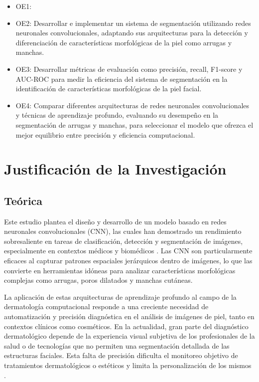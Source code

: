 \newcommand{\Objtwo}{
Desarrollar e implementar un sistema de segmentación utilizando redes neuronales convolucionales, adaptando sus arquitecturas para la detección y diferenciación de características morfológicas de la piel como arrugas y manchas.
}

\newcommand{\Objthree}{
Desarrollar métricas de evaluación como precisión, recall, F1-score y AUC-ROC para medir la eficiencia del sistema de segmentación en la identificación de características morfológicas de la piel facial.
}

\newcommand{\Objfour}{
Comparar diferentes arquitecturas de redes neuronales convolucionales y técnicas de aprendizaje profundo, evaluando su desempeño en la segmentación de arrugas y manchas, para seleccionar el modelo que ofrezca el mejor equilibrio entre precisión y eficiencia computacional.
}

\begin{itemize}
	\item OE1: {\Objone}
	\item OE2: {\Objtwo}
	\item OE3: {\Objthree}
	\item OE4: {\Objfour}
\end{itemize}


\section{Justificación de la Investigación}

\subsection{Teórica}

Este estudio plantea el diseño y desarrollo de un modelo basado en redes neuronales convolucionales (CNN), las cuales han demostrado un rendimiento sobresaliente en tareas de clasificación, detección y segmentación de imágenes, especialmente en contextos médicos y biomédicos \parencite{esteva2017}. Las CNN son particularmente eficaces al capturar patrones espaciales jerárquicos dentro de imágenes, lo que las convierte en herramientas idóneas para analizar características morfológicas complejas como arrugas, poros dilatados y manchas cutáneas.

La aplicación de estas arquitecturas de aprendizaje profundo al campo de la dermatología computacional responde a una creciente necesidad de automatización y precisión diagnóstica en el análisis de imágenes de piel, tanto en contextos clínicos como cosméticos. En la actualidad, gran parte del diagnóstico dermatológico depende de la experiencia visual subjetiva de los profesionales de la salud o de tecnologías que no permiten una segmentación detallada de las estructuras faciales. Esta falta de precisión dificulta el monitoreo objetivo de tratamientos dermatológicos o estéticos y limita la personalización de los mismos \parencite{lee2020}.

